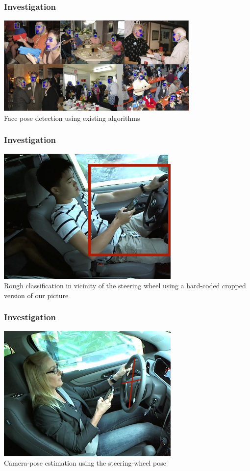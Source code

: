 \documentclass{beamer}
\begin{document}
    \begin{frame}
		\frametitle{Investigation}
        \begin{center}
        \includegraphics[width=10cm]{images/FacePose.jpg}\\
        Face pose detection using existing algorithms\end{center}
    \end{frame}

    \begin{frame}
		\frametitle{Investigation}
        \begin{center}
        \includegraphics[width=9cm]{images/HandLocalisation.jpg}\\
        Rough classification in vicinity of the steering wheel using a hard-coded cropped version of our picture\end{center}
    \end{frame}


    \begin{frame}
		\frametitle{Investigation}
        \begin{center}
        \includegraphics[width=9cm]{images/CameraPose.jpg}\\
        Camera-pose estimation using the steering-wheel pose\end{center}
    \end{frame}
\end{document}
